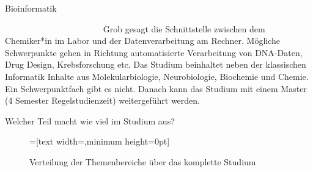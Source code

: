 
\begin{Huge}
    Bioinformatik
\end{Huge}

\begin{exampleblock}{\textcolor{white}{Was ist der Studiengang?}}
    Grob gesagt die Schnittstelle zwischen dem Chemiker*in im Labor und der Datenverarbeitung am Rechner. M\"ogliche Schwerpunkte gehen in Richtung automatisierte Verarbeitung von DNA-Daten, Drug Design, Krebsforschung etc.
    Das Studium beinhaltet neben der klassischen Informatik Inhalte aus Molekularbiologie, Neurobiologie, Biochemie und Chemie. Ein Schwerpunktfach gibt es nicht. Danach kann das Studium mit einem Master (4 Semester Regelstudienzeit) weitergef\"uhrt werden.
\end{exampleblock}

\begin{block}{Welcher Teil macht wie viel im Studium aus?}
    \begin{figure}[h!]
        \begin{minipage}{\linewidth}
            \centering
            =[text width={},minimum height=0pt]
        \end{minipage}
        \vspace{-20pt}
	\caption{Verteilung der Themenbereiche \"uber das komplette Studium}
    \end{figure}
\end{block}

